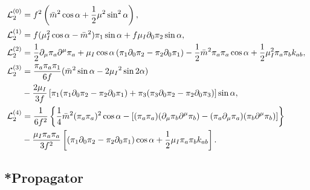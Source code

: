 \begin{align}
\mathcal{L}_2^{(0)}
&  =
    f^2   
    \left(
        \bar m^2 \cos{\alpha}
        + \frac{1}{2} \mu^2 \sin^2{\alpha}
    \right),
    \label{L0}
\\
\label{L1}
\mathcal{L}_2^{(1)}
& =
    f 
    (
        \mu_I^2\cos{\alpha}
        - \bar m^2
    ) \pi_1 \sin{\alpha}
    + f \mu_I \partial_0\pi_2 \sin{\alpha},
\\
\mathcal{L}_2^{(2)}
& =
    \frac{1}{2} \partial_\mu\pi_a\partial^\mu\pi_a
    + \mu_I \cos{\alpha} \left( \pi_1 \partial_0\pi_2 - \pi_2\partial_0\pi_1 \right)
    - \frac{1}{2} \bar m^2 \pi_a \pi_a \cos{\alpha}
    + \frac{1}{2} \mu_I ^2 \pi_a \pi_b k_{ab},
\label{L2}
\\
\notag
\mathcal{L}_2^{(3)}
& =
    \frac{\pi_a\pi_a \pi_1}{6f}
    (\bar m^2 \sin{\alpha}-2\mu_I{}^2 \sin{2\alpha})\\ \label{L3}
    &
    -
    \frac{2 \mu_I}{3 f}
    \left[
        \pi_1(\pi_1 \partial_0\pi_2 - \pi_2\partial_0\pi_1)
        +
        \pi_3(\pi_3\partial_0\pi_2-\pi_2 \partial_0\pi_3)
    \right]
    \sin{\alpha},
\\
\notag
\mathcal{L}_2^{(4)}
& =
\frac{1}{6f^2}
\left\{ 
    \frac{1}{4} \bar m^2 (\pi_a\pi_a)^2 \cos{\alpha}
    -
    \left[
        (\pi_a \pi_a) (\partial_\mu \pi_b \partial^\mu \pi_b )
        - (\pi_a \partial_\mu \pi_a)(\pi_b \partial^\mu \pi_b )
    \right]
 \right\}
\\
&
- \frac{\mu_I \pi_a\pi_a}{3f^2}
\left[
    \left(\pi_1\partial_0 \pi_2 - \pi_2 \partial_0 \pi_1\right)
    \cos{\alpha}
    + \frac{1}{2} \mu_I \pi_a \pi_b k_{ab}
\right].
\label{L4}
\end{align}
%


\subsection{*Propagator}
\label{section: propagator}

